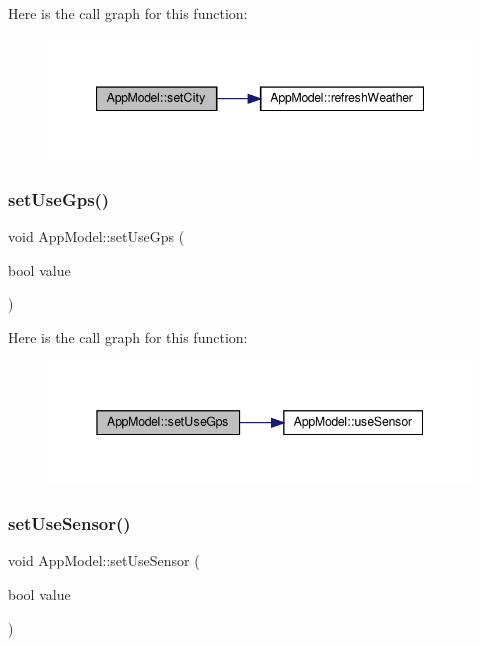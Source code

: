 Here is the call graph for this function\+:
\nopagebreak
\begin{figure}[H]
\begin{center}
\leavevmode
\includegraphics[width=347pt]{class_app_model_ad0135d4a1551b6484ac28c434f861af5_cgraph}
\end{center}
\end{figure}
\mbox{\label{class_app_model_a81c3ffb3370837086366c9f70bb3d5eb}} 
\subsubsection{\texorpdfstring{set\+Use\+Gps()}{setUseGps()}}
{\footnotesize\ttfamily void App\+Model\+::set\+Use\+Gps (\begin{DoxyParamCaption}\item[{bool}]{value }\end{DoxyParamCaption})}

Here is the call graph for this function\+:
\nopagebreak
\begin{figure}[H]
\begin{center}
\leavevmode
\includegraphics[width=345pt]{class_app_model_a81c3ffb3370837086366c9f70bb3d5eb_cgraph}
\end{center}
\end{figure}
\mbox{\label{class_app_model_ad1369130f74b4aabd0ac0d6b1b030014}} 
\subsubsection{\texorpdfstring{set\+Use\+Sensor()}{setUseSensor()}}
{\footnotesize\ttfamily void App\+Model\+::set\+Use\+Sensor (\begin{DoxyParamCaption}\item[{bool}]{value }\end{DoxyParamCaption})}

